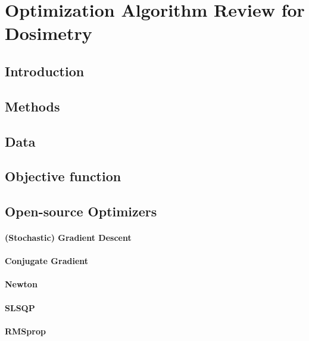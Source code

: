 \section{Optimization Algorithm Review for Dosimetry}
\subsection{Introduction}

\subsection{Methods}

\subsection{Data}
\subsection{Objective function}
\subsection{Open-source Optimizers}
\paragraph{(Stochastic) Gradient Descent}
\paragraph{Conjugate Gradient}
\paragraph{Newton}
\paragraph{SLSQP}
\paragraph{RMSprop}
